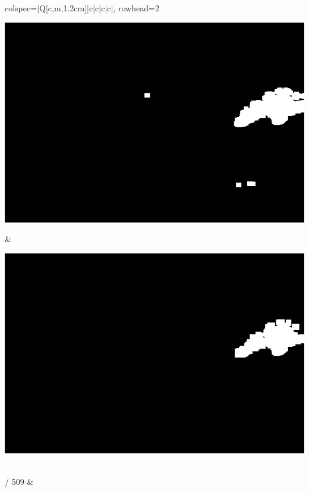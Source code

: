 \begin{longtblr}[
            caption = {Hasil uji coba proses \textit{background subtraction} menggunakan GMM yang disempurnakan oleh Operasi Morfologi},
            label = {tab:gmm_morph_9908}
        ]{
            colspec={|Q[c,m,1.2cm]|c|c|c|c|},
            rowhead=2
        }
\begin{minipage}{0.19\textwidth}
                \includegraphics[width=\linewidth]{image/9908/9908_dilated_5x11_frame290.jpg}
            \end{minipage} & 
            \begin{minipage}{0.19\textwidth}
                \includegraphics[width=\linewidth]{image/9908/9908_dilated_7x13_frame290.jpg}
            \end{minipage} \\
             / 509 &
            \begin{minipage}{0.19\textwidth}

\end{minipage}
\end{longtblr}
